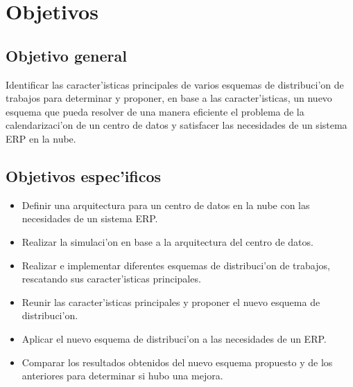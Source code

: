 
\chapter*{Objetivos}

\section*{Objetivo general}

Identificar las caracter'isticas principales de varios esquemas de distribuci'on de trabajos para determinar y proponer, en base a las caracter'isticas, un nuevo esquema que pueda resolver de una manera eficiente el problema de la calendarizaci'on de un centro de datos y satisfacer las necesidades de un sistema ERP en la nube.

\section*{Objetivos espec'ificos}


\begin{itemize}
\item Definir una arquitectura para un centro de datos en la nube con las necesidades de un sistema ERP.
\item Realizar la simulaci'on en base a la arquitectura del centro de datos.
\item Realizar e implementar diferentes esquemas de distribuci'on de trabajos, rescatando sus caracter'isticas principales.
\item Reunir las caracter'isticas principales y proponer el nuevo esquema de distribuci'on.
\item Aplicar el nuevo esquema de distribuci'on a las necesidades de un ERP.
\item Comparar los resultados obtenidos del nuevo esquema propuesto y de los anteriores para determinar si hubo una mejora.
\end{itemize}
